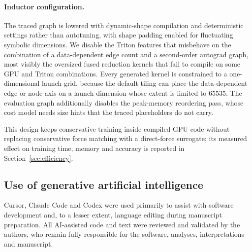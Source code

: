 \paragraph{Inductor configuration.}
The traced graph is lowered with dynamic-shape compilation and deterministic settings rather than autotuning, with shape padding enabled for fluctuating symbolic dimensions.
We disable the Triton features that misbehave on the combination of a data-dependent edge count and a second-order autograd graph, most visibly the oversized fused reduction kernels that fail to compile on some GPU and Triton combinations.
Every generated kernel is constrained to a one-dimensional launch grid, because the default tiling can place the data-dependent edge or node axis on a launch dimension whose extent is limited to $65535$.
The evaluation graph additionally disables the peak-memory reordering pass, whose cost model needs size hints that the traced placeholders do not carry.

This design keeps conservative training inside compiled GPU code without replacing conservative force matching with a direct-force surrogate; its measured effect on training time, memory and accuracy is reported in Section~\ref{sec:efficiency}.

\subsection{Use of generative artificial intelligence}

Cursor, Claude Code and Codex were used primarily to assist with software development and, to a lesser extent, language editing during manuscript preparation.
All AI-assisted code and text were reviewed and validated by the authors, who remain fully responsible for the software, analyses, interpretations and manuscript.

